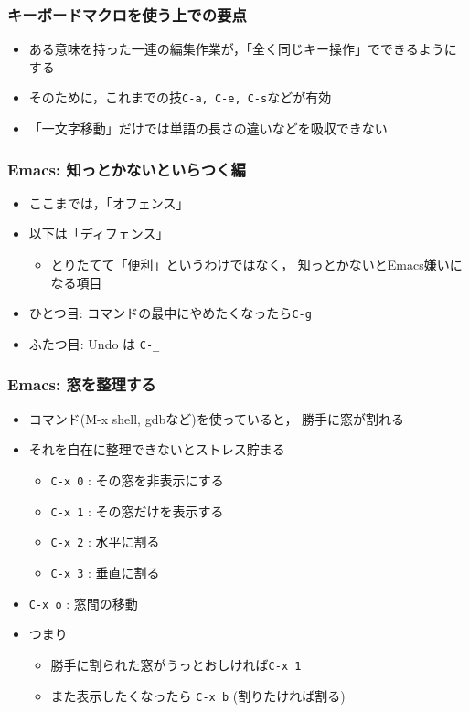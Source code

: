 \documentclass[12pt,dvipdfmx]{beamer}
\newcommand{\ao}[1]{{\color{blue}#1}}
\newcommand{\aka}[1]{{\color{red}#1}}
\begin{document}
\begin{frame}
\frametitle{キーボードマクロを使う上での要点}
\begin{itemize}
\item ある意味を持った一連の編集作業が，「全く同じキー操作」でできるようにする
\item そのために，これまでの技\texttt{C-a, C-e, C-s}などが有効
\item 「一文字移動」だけでは単語の長さの違いなどを吸収できない
\end{itemize}


\end{frame}


\begin{frame}
\frametitle{Emacs: 知っとかないといらつく編}
\begin{itemize}
\item ここまでは，「オフェンス」
\item 以下は「ディフェンス」
  \begin{itemize}
  \item とりたてて「便利」というわけではなく，
    知っとかないとEmacs嫌いになる項目
  \end{itemize}

\item ひとつ目: コマンドの最中にやめたくなったら\ao{\texttt{C-g}}
\item ふたつ目: Undo は \ao{\texttt{C-\_}}
\end{itemize}


\end{frame}


\begin{frame}
\frametitle{Emacs: 窓を整理する}
\begin{itemize}
\item コマンド(M-x shell, gdbなど)を使っていると，
  勝手に窓が割れる
\item それを自在に整理できないとストレス貯まる
  \begin{itemize}
  \item \texttt{\ao{C-x 0}} : その窓を非表示にする
  \item \texttt{\ao{C-x 1}} : その窓\aka{だけを表示}する
  \item \texttt{\ao{C-x 2}} : 水平に割る
  \item \texttt{\ao{C-x 3}} : 垂直に割る
  \end{itemize}
\item \texttt{\ao{C-x o}} : 窓間の移動
\item つまり
  \begin{itemize}
  \item 勝手に割られた窓がうっとおしければ\texttt{\ao{C-x 1}}
  \item また表示したくなったら \texttt{\ao{C-x b}} (割りたければ割る)
  \end{itemize}
\end{itemize}
\end{frame}
\end{document}
